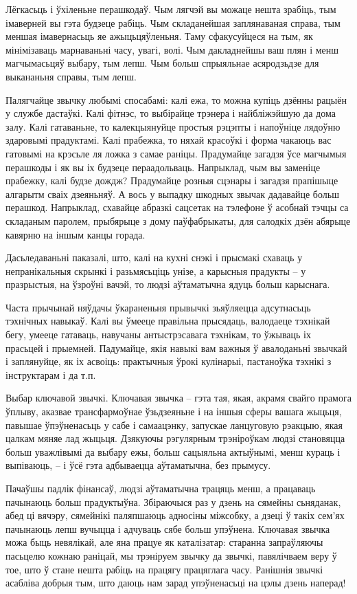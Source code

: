 Лёгкасьць і ўхіленьне перашкодаў. Чым лягчэй вы можаце нешта зрабіць, тым імаверней вы гэта будзеце рабіць. Чым складанейшая заплянаваная справа, тым меншая імавернасьць яе ажыцьцяўленьня. Таму сфакусуйцеся на тым, як мінімізаваць марнаваньні часу, увагі, волі. Чым дакладнейшы ваш плян і менш магчымасьцяў выбару, тым лепш. Чым больш спрыяльнае асяродзьдзе для выкананьня справы, тым лепш.

Палягчайце звычку любымі спосабамі: калі ежа, то можна купіць дзённы рацыён у службе дастаўкі. Калі фітнэс, то выбірайце трэнера і найбліжэйшую да дома залу. Калі гатаваньне, то калекцыянуйце простыя рэцэпты і напоўніце лядоўню здаровымі прадуктамі. Калі прабежка, то няхай красоўкі і форма чакаюць вас гатовымі на крэсьле ля ложка з самае раніцы. Прадумайце загадзя ўсе магчымыя перашкоды і як вы іх будзеце пераадольваць. Напрыклад, чым вы заменіце прабежку, калі будзе дождж? Прадумайце розныя сцэнары і загадзя прапішыце алгарытм сваіх дзеяньняў. А вось у выпадку шкодных звычак дадавайце больш перашкод. Напрыклад, схавайце абразкі сацсетак на тэлефоне ў асобнай тэчцы са складаным паролем, прыбярыце з дому паўфабрыкаты, для салодкіх дзён абярыце кавярню на іншым канцы горада.

Дасьледаваньні паказалі, што, калі на кухні снэкі і прысмакі схаваць у непранікальныя скрынкі і разьмясьціць унізе, а карысныя прадукты – у празрыстыя, на ўзроўні вачэй, то людзі аўтаматычна ядуць больш карыснага. 

Часта прычынай няўдачы ўкараненьня прывычкі зьяўляецца адсутнасьць тэхнічных навыкаў. Калі вы ўмееце правільна прысядаць, валодаеце тэхнікай бегу, умееце гатаваць, навучаны антыстрэсавага тэхнікам, то ўжываць іх прасьцей і прыемней. Падумайце, якія навыкі вам важныя ў авалоданьні звычкай і заплянуйце, як іх асвоіць: практычныя ўрокі кулінарыі, пастаноўка тэхнікі з інструктарам і да т.п.

Выбар ключавой звычкі. Ключавая звычка – гэта тая, якая, акрамя свайго прамога ўплыву, аказвае трансфармоўнае ўзьдзеяньне і на іншыя сферы вашага жыцьця, павышае ўпэўненасьць у сабе і самаацэнку, запускае ланцуговую рэакцыю, якая цалкам мяняе лад жыцьця. Дзякуючы рэгулярным трэніроўкам людзі становяцца больш уважлівымі да выбару ежы, больш сацыяльна актыўнымі, менш кураць і выпіваюць, – і ўсё гэта адбываецца аўтаматычна, без прымусу.

Пачаўшы падлік фінансаў, людзі аўтаматычна трацяць менш, а працаваць пачынаюць больш прадуктыўна. Збіраючыся раз у дзень на сямейны сьняданак, абед ці вячэру, сямейнікі паляпшаюць адносіны міжсобку, а дзеці ў такіх сем'ях пачынаюць лепш вучыцца і адчуваць сябе больш упэўнена. Ключавая звычка можа быць невялікай, але яна працуе як каталізатар: старанна запраўляючы пасьцелю кожнаю раніцай, мы трэніруем звычку да звычкі, павялічваем веру ў тое, што ў стане нешта рабіць на працягу працяглага часу. Ранішнія звычкі асабліва добрыя тым, што даюць нам зарад упэўненасьці на цэлы дзень наперад!

